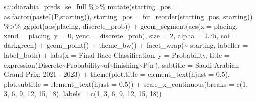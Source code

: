 \documentclass[
]{book}
\newenvironment{Shaded}{\begin{snugshade}}{\end{snugshade}}
\newcommand{\AttributeTok}[1]{\textcolor[rgb]{0.77,0.63,0.00}{#1}}
\newcommand{\DecValTok}[1]{\textcolor[rgb]{0.00,0.00,0.81}{#1}}
\newcommand{\FloatTok}[1]{\textcolor[rgb]{0.00,0.00,0.81}{#1}}
\newcommand{\FunctionTok}[1]{\textcolor[rgb]{0.00,0.00,0.00}{#1}}
\newcommand{\NormalTok}[1]{#1}
\newcommand{\SpecialCharTok}[1]{\textcolor[rgb]{0.00,0.00,0.00}{#1}}
\newcommand{\StringTok}[1]{\textcolor[rgb]{0.31,0.60,0.02}{#1}}
\begin{document}
\begin{Shaded}
\begin{Highlighting}[]
\NormalTok{saudiarabia\_preds\_se\_full }\SpecialCharTok{\%\textgreater{}\%}
  \FunctionTok{mutate}\NormalTok{(}\AttributeTok{starting\_pos =} \FunctionTok{as.factor}\NormalTok{(}\FunctionTok{paste0}\NormalTok{(}\StringTok{\textquotesingle{}P\textquotesingle{}}\NormalTok{,starting)),}
         \AttributeTok{starting\_pos =} \FunctionTok{fct\_reorder}\NormalTok{(starting\_pos, starting)) }\SpecialCharTok{\%\textgreater{}\%}
  \FunctionTok{ggplot}\NormalTok{(}\FunctionTok{aes}\NormalTok{(placing, discrete\_prob)) }\SpecialCharTok{+}
  \FunctionTok{geom\_segment}\NormalTok{(}\FunctionTok{aes}\NormalTok{(}\AttributeTok{x =}\NormalTok{ placing, }\AttributeTok{xend =}\NormalTok{ placing, }\AttributeTok{y =} \DecValTok{0}\NormalTok{, }\AttributeTok{yend =}\NormalTok{ discrete\_prob),}
               \AttributeTok{size =} \DecValTok{2}\NormalTok{, }\AttributeTok{alpha =} \FloatTok{0.75}\NormalTok{, }\AttributeTok{col =} \StringTok{\textquotesingle{}darkgreen\textquotesingle{}}\NormalTok{) }\SpecialCharTok{+}
  \FunctionTok{geom\_point}\NormalTok{() }\SpecialCharTok{+}
  \FunctionTok{theme\_bw}\NormalTok{() }\SpecialCharTok{+}
  \FunctionTok{facet\_wrap}\NormalTok{(}\SpecialCharTok{\textasciitilde{}}\NormalTok{ starting, }\AttributeTok{labeller =}\NormalTok{ label\_both) }\SpecialCharTok{+}
  \FunctionTok{labs}\NormalTok{(}\AttributeTok{x =} \StringTok{\textquotesingle{}Final Race Classification\textquotesingle{}}\NormalTok{,}
       \AttributeTok{y =} \StringTok{\textquotesingle{}Probability\textquotesingle{}}\NormalTok{,}
       \AttributeTok{title =} \FunctionTok{expression}\NormalTok{(Discrete}\SpecialCharTok{\textasciitilde{}}\NormalTok{Probability}\SpecialCharTok{\textasciitilde{}}\NormalTok{of}\SpecialCharTok{\textasciitilde{}}\NormalTok{finishing}\SpecialCharTok{\textasciitilde{}}\NormalTok{P[n]),}
       \AttributeTok{subtitle =} \StringTok{\textquotesingle{}Saudi Arabian Grand Prix: 2021 {-} 2023\textquotesingle{}}\NormalTok{) }\SpecialCharTok{+}
  \FunctionTok{theme}\NormalTok{(}\AttributeTok{plot.title =} \FunctionTok{element\_text}\NormalTok{(}\AttributeTok{hjust =} \FloatTok{0.5}\NormalTok{),}
        \AttributeTok{plot.subtitle =} \FunctionTok{element\_text}\NormalTok{(}\AttributeTok{hjust =} \FloatTok{0.5}\NormalTok{)) }\SpecialCharTok{+}
  \FunctionTok{scale\_x\_continuous}\NormalTok{(}\AttributeTok{breaks =} \FunctionTok{c}\NormalTok{(}\DecValTok{1}\NormalTok{, }\DecValTok{3}\NormalTok{, }\DecValTok{6}\NormalTok{, }\DecValTok{9}\NormalTok{, }\DecValTok{12}\NormalTok{, }\DecValTok{15}\NormalTok{, }\DecValTok{18}\NormalTok{), }\AttributeTok{labels =} \FunctionTok{c}\NormalTok{(}\DecValTok{1}\NormalTok{, }\DecValTok{3}\NormalTok{, }\DecValTok{6}\NormalTok{, }\DecValTok{9}\NormalTok{, }\DecValTok{12}\NormalTok{, }\DecValTok{15}\NormalTok{, }\DecValTok{18}\NormalTok{))}
\end{Highlighting}
\end{Shaded}
\end{document}
